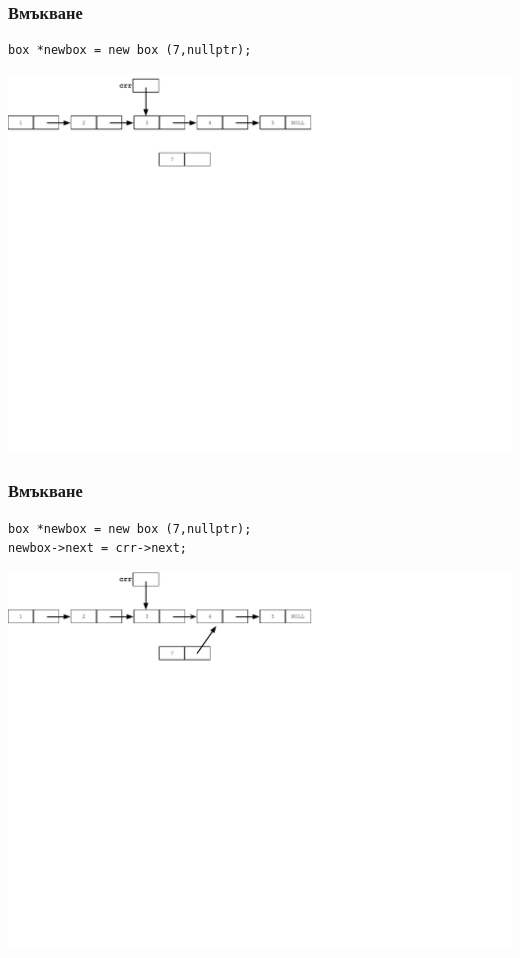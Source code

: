 \documentclass{beamer}
\begin{document}
\begin{frame}[fragile]
\frametitle{Вмъкване}

\begin{flushleft}
\begin{lstlisting}
box *newbox = new box (7,nullptr);
\end{lstlisting}  
\end{flushleft}


\includegraphics[width=14.0cm]{images/05_ll_insert_start}

\end{frame}

\begin{frame}[fragile]
\frametitle{Вмъкване}

\begin{flushleft}
\begin{lstlisting}
box *newbox = new box (7,nullptr);
newbox->next = crr->next;
\end{lstlisting}  
\end{flushleft}


\includegraphics[width=14.0cm]{images/05_ll_insert_firstlink}

\end{frame}
\end{document}
